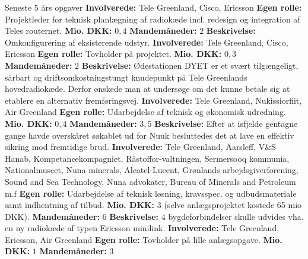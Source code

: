 \begin{rubric}{Seneste 5 års opgaver}
\entry* \textbf{Involverede:} Tele Greenland, Cisco, Ericsson
\entry* \textbf{Egen rolle:} Projektleder for teknisk planlægning af radiokæde incl. redesign og integration af Teles routernet.
\entry* \textbf{Mio. DKK:} $0,4$
\entry* \textbf{Mandemåneder:} $2$
%
 \textbf{Beskrivelse:} Omkonfigurering af eksisterende udstyr.
\entry* \textbf{Involverede:} Tele Greenland, Cisco, Ericsson
\entry* \textbf{Egen rolle:} Tovholder på projektet.
\entry* \textbf{Mio. DKK:} $0,3$
\entry* \textbf{Mandemåneder:} $2$
%
 \textbf{Beskrivelse:} Ødestationen DYET er et svært tilgængeligt, sårbart og driftsomkostningstungt knudepunkt på Tele Greenlands hovedradiokæde. Derfor ønskede man at undersøge om det kunne betale sig at etablere en alternativ fremføringsvej.
\entry* \textbf{Involverede:} Tele Greenland, Nukissiorfiit, Air Greenland
\entry* \textbf{Egen rolle:} Udarbejdelse af teknisk og økonomisk udredning.
\entry* \textbf{Mio. DKK:} $0,4$
\entry* \textbf{Mandemåneder:} $3,5$
%
 \textbf{Beskrivelse:} Efter at isfjelde gentagne gange havde overskåret søkablet ud for Nuuk besluttedes det at lave en effektiv sikring mod fremtidige brud.
\entry* \textbf{Involverede:} Tele Greenland, Aarsleff, V\&S Hanab, Kompetancekompagniet, Råstoffor-valtningen, Sermersooq kommunia, Nationalmuseet, Nuna minerals, Alcatel-Lucent, Grønlands arbejdsgiverforening, Sound and Sea Technology, Nuna advokater, Bureau of Minerals and Petroleum m.f
\entry* \textbf{Egen rolle:} Udarbejdelse af teknisk løsning, kravsspec. og udbudsmateriale samt indhentning af tilbud. 
\entry* \textbf{Mio. DKK:} $3$ (selve anlægsprojektet kostede 65 mio DKK).
\entry* \textbf{Mandemåneder:} $6$
%
 \textbf{Beskrivelse:} 4 bygdeforbindelser skulle udvides vha. en ny radiokæde af typen Ericsson minilink.
\entry* \textbf{Involverede:} Tele Greenland, Ericsson, Air Greenland
\entry* \textbf{Egen rolle:} Tovholder på lille anlægsopgave.
\entry* \textbf{Mio. DKK:} $1$
\entry* \textbf{Mandemåneder:} $3$
%

\end{rubric}
